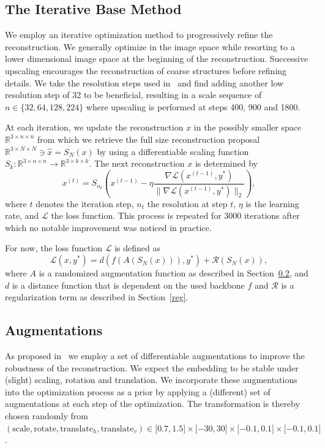 \documentclass[10pt,twocolumn]{article}
\begin{document}
\subsection{The Iterative Base Method}\label{base_method}
We employ an iterative optimization method to progressively refine the reconstruction.
We generally optimize in the image space while resorting to a lower dimensional image space at the beginning of the reconstruction.
Successive upscaling encourages the reconstruction of coarse structures before refining details.
We take the resolution steps used in~\cite{kazemiWhatWeLearn2024} and find adding another low resolution step of 32 to be beneficial, resulting in a scale sequence of $n\in\{32, 64, 128, 224\}$ where upscaling is performed at steps 400, 900 and 1800.

At each iteration, we update the reconstruction $x$ in the possibly smaller space $\mathbb{R}^{3\times n \times n}$ from which we retrieve the full size reconstruction proposal $\mathbb{R}^{3\times N \times N}\ni\hat{x} = S_N(x)$ by using a differentiable scaling function $S_k:\mathbb{R}^{3\times n \times n}\rightarrow\mathbb{R}^{3\times k \times k}$.
The next reconstruction $x$ is determined by
$$
x^{(t)} = S_{n_t}\left(x^{(t-1)} - \eta \dfrac{\nabla \mathcal{L}(x^{(t-1)}, y^*)}{\|\nabla \mathcal{L}(x^{(t-1)}, y^*)\|_2}\right),
$$
where $t$ denotes the iteration step, $n_t$ the resolution at step $t$, $\eta$ is the learning rate, and $\mathcal{L}$ the loss function.
This process is repeated for 3000 iterations after which no notable improvement was noticed in practice.

For now, the loss function $\mathcal{L}$ is defined as
$$
\mathcal{L}(x, y^*) = d(f(A(S_N(x))), y^*) + \mathcal{R}(S_N(x)),
$$
where $A$ is a randomized augmentation function as described in Section~\ref{augs}, and $d$ is a distance function that is dependent on the used backbone $f$ and $\mathcal{R}$ is a regularization term as described in Section~\ref{reg}.

\subsection{Augmentations}\label{augs}
As proposed in~\cite{ghiasiPlugInInversionModelAgnostic2021} we employ a set of differentiable augmentations to improve the robustness of the reconstruction.
We expect the embedding to be stable under (slight) scaling, rotation and translation.
We incorporate these augmentations into the optimization process as a prior by applying a (different) set of augmentations at each step of the optimization.
The transformation is thereby chosen randomly from $(\text{scale}, \text{rotate}, \text{translate}_h, \text{translate}_v) \in \lbrack 0.7, 1.5\rbrack\times \lbrack -30, 30\rbrack \times \lbrack -0.1, 0.1\rbrack \times \lbrack -0.1, 0.1\rbrack$.
\end{document}
